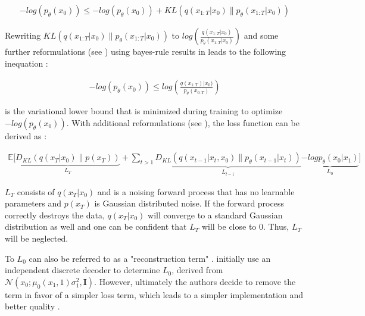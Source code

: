 \begin{equation}
  \label{eqn:vlb_b}
  \begin{align*}
    -log(p_\theta(x_0)) \leq -log(p_\theta(x_0)) + KL(q(x_{1:T}|x_0) \parallel p_\theta(x_{1:T}|x_0))
  \end{align*}
\end{equation}

\noindent Rewriting $KL(q(x_{1:T}|x_0) \parallel p_\theta(x_{1:T}|x_0))$ to $log(\frac{q(x_{1:T}|x_0)}{p_\theta(x_{1:T}|x_0)})$ and some further reformulations (see ) using bayes-rule results in  leads to the following inequation \cite{ho2020DenoisingDiffusionProbabilistic}:

\begin{equation}
  \label{eqn:vlb2}
  \begin{align*}
    -log(p_\theta(x_0)) \leq log(\frac{q(x_{1:T})|x_0)}{p_\theta(x_{0:T})})
  \end{align*}
\end{equation}

\noindent {} is the variational lower bound that is minimized during training to optimize $-log(p_\theta(x_0))$.
With additional reformulations (see ), the loss function can be derived as \cite{ho2020DenoisingDiffusionProbabilistic}:

\begin{equation}
  \label{eqn:vlb3}
  \begin{align*}
   \mathbb{E}\biggl[\underbrace{D_{KL}(q(x_{T}|x_0) \parallel p(x_T))}_{L_T} + \sum_{t>1}^{} \underbrace{  D_{KL}(q(x_{t-1}|x_t,x_0) \parallel p_\theta(x_{t-1}|x_t)) }_{L_{t-1}}  \underbrace{ -log p_\theta(x_0|x_1) }_{L_{0}}\biggr]
  \end{align*}
\end{equation}

$L_T$ consists of $q(x_{T}|x_0)$ and is a noising forward process that has no learnable parameters and $p(x_T)$ is Gaussian distributed noise.
If the forward process correctly destroys the data, $q(x_{T}|x_0)$ will converge to a standard Gaussian distribution as well and one can be confident that $L_T$ will be close to $0$.
Thus, $L_T$ will be neglected.

To $L_{0}$ can also be referred to as a "reconstruction term" \cite[p. 10]{luo2022UnderstandingDiffusionModels}.
\textcite{ho2020DenoisingDiffusionProbabilistic} initially use an independent discrete decoder to determine $L_{0}$, derived from $\mathcal{N}(x_0;\mu_0(x_1,1)\sigma^2_1,\textbf{I})$.
However, ultimately the authors decide to remove the term in favor of a simpler loss term, which leads to a simpler implementation and better quality \cite{ho2020DenoisingDiffusionProbabilistic}.

